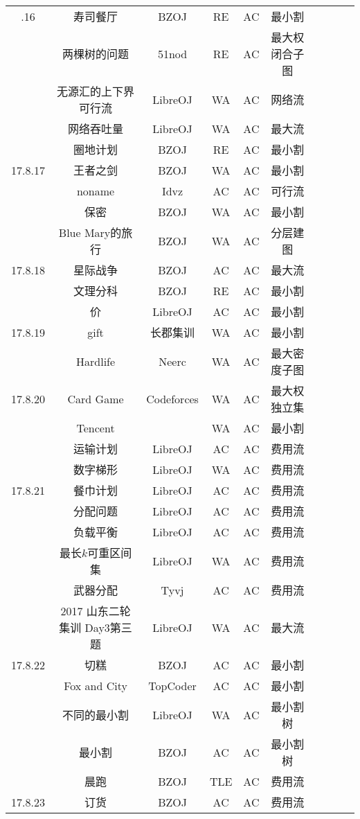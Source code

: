 \documentclass[landscape]{article}
\begin{document}
\begin{longtable}{cccccccccc}
  \newpage
  \hline
  17.8.16 & 寿司餐厅 & BZOJ & RE & AC & 最小割\\
  & 两棵树的问题 & 51nod & RE & AC & 最大权闭合子图\\
  & 无源汇的上下界可行流 & LibreOJ & WA & AC & 网络流\\
  & 网络吞吐量 & LibreOJ & WA & AC & 最大流\\
  & 圈地计划 & BZOJ & RE & AC & 最小割\\
  \hline
  17.8.17 & 王者之剑 & BZOJ & WA & AC & 最小割\\
  & noname & Idvz & AC & AC & 可行流\\
  & 保密 & BZOJ & WA & AC & 最小割\\
  & Blue Mary的旅行 & BZOJ & WA & AC & 分层建图\\
  \hline
  17.8.18 & 星际战争 & BZOJ & AC & AC & 最大流\\
  & 文理分科 & BZOJ & RE & AC & 最小割\\
  & 价 & LibreOJ & AC & AC & 最小割\\
  \hline
  17.8.19 & gift & 长郡集训 & WA & AC & 最小割\\
  & Hardlife & Neerc & WA & AC & 最大密度子图\\
  \hline
  17.8.20 & Card Game & Codeforces & WA & AC & 最大权独立集\\
  & Tencent & & WA & AC & 最小割\\
  & 运输计划 & LibreOJ & AC & AC & 费用流\\
  & 数字梯形 & LibreOJ & WA & AC & 费用流\\
  \hline
  17.8.21 & 餐巾计划 & LibreOJ & AC & AC & 费用流\\
  & 分配问题 & LibreOJ & AC & AC & 费用流\\
  & 负载平衡 & LibreOJ & AC & AC & 费用流\\
  & 最长$k$可重区间集 & LibreOJ & WA & AC & 费用流\\
  & 武器分配 & Tyvj & AC & AC & 费用流 \\
  & 2017 山东二轮集训 Day3第三题 & LibreOJ & WA & AC & 最大流\\
  \hline
  17.8.22 & 切糕 & BZOJ & AC & AC & 最小割\\
  & Fox and City & TopCoder & AC & AC & 最小割\\
  & 不同的最小割 & LibreOJ & WA & AC & 最小割树\\
  & 最小割 & BZOJ & AC & AC & 最小割树\\
  & 晨跑 & BZOJ & TLE & AC & 费用流\\
  \hline
  17.8.23 & 订货 & BZOJ & AC & AC & 费用流\\

\end{longtable}
\end{document}
